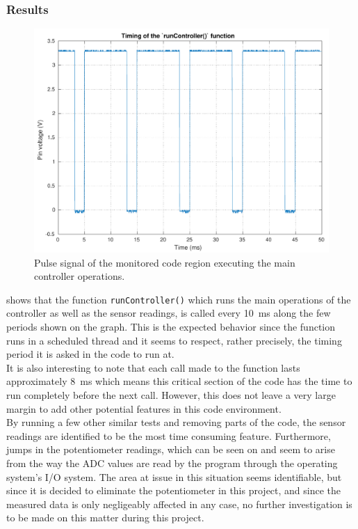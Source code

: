 \subsubsection{Results}
\begin{figure}[H]
  \centering
  \includegraphics[scale=0.6]{figures/programTiming}
  \caption{Pulse signal of the monitored code region executing the main controller operations.}
  \label{fig:programTiming}
\end{figure}
 shows that the function \lstinline{runController()} which runs the main operations of the controller as well as the sensor readings, is called every \SI{10}{ms} along the few periods shown on the graph. This is the expected behavior since the function runs in a scheduled thread and it seems to respect, rather precisely, the timing period it is asked in the code to run at.\\
It is also interesting to note that each call made to the function lasts approximately \SI{8}{ms} which means this critical section of the code has the time to run completely before the next call. However, this does not leave a very large margin to add other potential features in this code environment.\\
By running a few other similar tests and removing parts of the code, the sensor readings are identified to be the most time consuming feature. Furthermore, jumps in the potentiometer readings, which can be seen on  and  seem to arise from the way the ADC values are read by the program through the operating system's I/O system. The area at issue in this situation seems identifiable, but since it is decided to eliminate the potentiometer in this project, and since the measured data is only negligeably affected in any case, no further investigation is to be made on this matter during this project.

